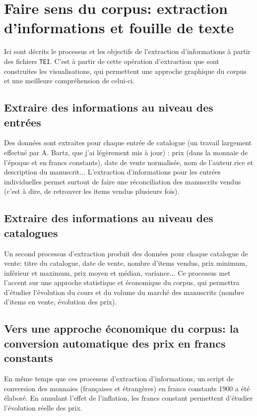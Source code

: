 \documentclass[a4paper, 12pt, twoside]{book}
\newcommand{\tei}{\texttt{TEI}}
\begin{document}
\section{Faire sens du corpus: extraction d'informations et fouille de texte}
Ici sont décrits le processus et les objectifs de l'extraction d'informations à partir des fichiers \tei{}. C'est à partir de cette opération d'extraction que sont construites les visualisations, qui permettent une approche graphique du corpus et une meilleure compréhension de celui-ci.

\subsection{Extraire des informations au niveau des entrées}
Des données sont extraites pour chaque entrée de catalogue (un travail largement effectué par A. Bartz, que j'ai légèrement mis à jour) : prix (dans la monnaie de l'époque et en francs constants), date de vente normalisée, nom de l'auteur.rice et description du manuscrit... L'extraction d'informations pour les entrées individuelles permet surtout de faire une réconciliation des manuscrits vendus (c'est à dire, de retrouver les items vendus plusieurs fois).

\subsection{Extraire des informations au niveau des catalogues}
Un second processus d'extraction produit des données pour chaque catalogue de vente: titre du catalogue, date de vente, nombre d'items vendus, prix minimum, inférieur et maximum, prix moyen et médian, variance... Ce processus met l'accent sur une approche statistique et économique du corpus, qui permettra d'étudier l'évolution du cours et du volume du marché des manuscrits (nombre d'items en vente, évolution des prix).

\subsection{Vers une approche économique du corpus: la conversion automatique des prix en francs constants}
En même temps que ces processus d'extraction d'informations, un script de conversion des monnaies (françaises et étrangères) en francs constants 1900 a été élaboré. En annulant l'effet de l'inflation, les francs constant permettent d'étudier l'évolution réelle des prix.
\end{document}
